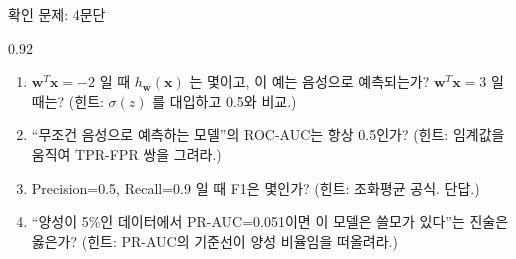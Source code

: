 \begin{frame}{확인 문제: 4문단}
\begin{center}\begin{varwidth}{0.92\textwidth}
  \begin{enumerate}
    \item $\boldsymbol{w}^T\boldsymbol{x} = -2$ 일 때 $h_{\boldsymbol{w}}(\boldsymbol{x})$ 는 몇이고, 이 예는 음성으로
      예측되는가? $\boldsymbol{w}^T\boldsymbol{x} = 3$ 일 때는?
      (힌트: $\sigma(z)$ 를 대입하고 0.5와 비교.)
    \item ``무조건 음성으로 예측하는 모델''의 ROC-AUC는 항상 0.5인가?
      (힌트: 임계값을 움직여 TPR-FPR 쌍을 그려라.)
    \item Precision=0.5, Recall=0.9 일 때 F1은 몇인가?
      (힌트: 조화평균 공식. 단답.)
    \item ``양성이 5\%인 데이터에서 PR-AUC=0.051이면 이 모델은
      쓸모가 있다''는 진술은 옳은가? (힌트: PR-AUC의 기준선이
      양성 비율임을 떠올려라.)
  \end{enumerate}
\end{varwidth}\end{center}
\end{frame}
